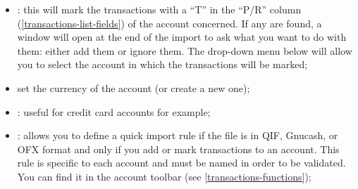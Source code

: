 \begin{enumerate}
\begin{itemize}
			\item {}:%
			this will mark the transactions with a \enquote{T} in the \enquote{P/R} column (\vref{transactions-list-fields}) of the account concerned. If any  are found, a window will open at the end of the import to ask what you want to do with them: either add them or ignore them. The  drop-down menu below will allow you to select the account in which the transactions will be marked;
			\item set the currency of the account (or create a new one);
			\item {}: useful for credit card accounts for example;
			\item {}:%
			allows you to define a quick import rule if the file is in \gls{QIF}, \gls{Gnucash}, or \gls{OFX} format and only if you add or mark transactions to an account. This rule is specific to each account and must be named in order to be validated. You can find it in the account toolbar (see \vref{transactions-functions});

\end{itemize}
\end{enumerate}
